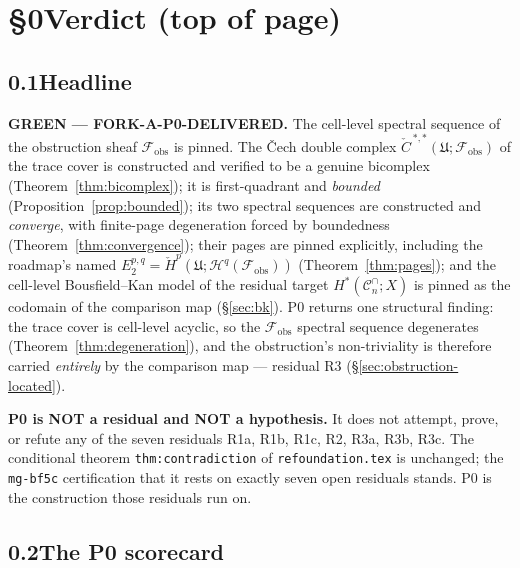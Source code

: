 \documentclass[11pt,oneside]{amsart}
\theoremstyle{plain}
\theoremstyle{definition}
\theoremstyle{remark}
\theoremstyle{honeststyle}
\newcommand{\Cn}{\mathcal{C}^{\cap}_n}
\newcommand{\fobs}{\mathcal{F}_{\mathrm{obs}}}
\newcommand{\Uf}{\mathfrak{U}}
\newcommand{\Ccheck}{\check{C}}
\begin{document}
\maketitle

\tableofcontents

\section*{\S0\quad Verdict (top of page)}

\subsection*{0.1\quad Headline}

\noindent\textbf{GREEN --- FORK-A-P0-DELIVERED.} The cell-level
spectral sequence of the obstruction sheaf $\fobs$ is pinned. The
\v{C}ech double complex $\Ccheck^{\,*,*}(\Uf;\fobs)$ of the trace
cover is constructed and verified to be a genuine bicomplex
(Theorem~\ref{thm:bicomplex}); it is first-quadrant and \emph{bounded}
(Proposition~\ref{prop:bounded}); its two spectral sequences are
constructed and \emph{converge}, with finite-page degeneration forced
by boundedness (Theorem~\ref{thm:convergence}); their pages are pinned
explicitly, including the roadmap's named
$E_{2}^{p,q}=\check H^{p}(\Uf;\mathcal H^{q}(\fobs))$
(Theorem~\ref{thm:pages}); and the cell-level Bousfield--Kan model of
the residual target $H^{*}(\Cn;X)$ is pinned as the codomain of the
comparison map (\S\ref{sec:bk}). P0 returns one structural finding:
the trace cover is cell-level acyclic, so the $\fobs$ spectral
sequence degenerates (Theorem~\ref{thm:degeneration}), and the
obstruction's non-triviality is therefore carried \emph{entirely} by
the comparison map --- residual R3 (\S\ref{sec:obstruction-located}).

\smallskip
\noindent\textbf{P0 is NOT a residual and NOT a hypothesis.} It does
not attempt, prove, or refute any of the seven residuals R1a, R1b,
R1c, R2, R3a, R3b, R3c. The conditional theorem
\texttt{thm:contradiction} of \texttt{refoundation.tex} is unchanged;
the \texttt{mg-bf5c} certification that it rests on exactly seven open
residuals stands. P0 is the construction those residuals run on.

\subsection*{0.2\quad The P0 scorecard}
\end{document}
